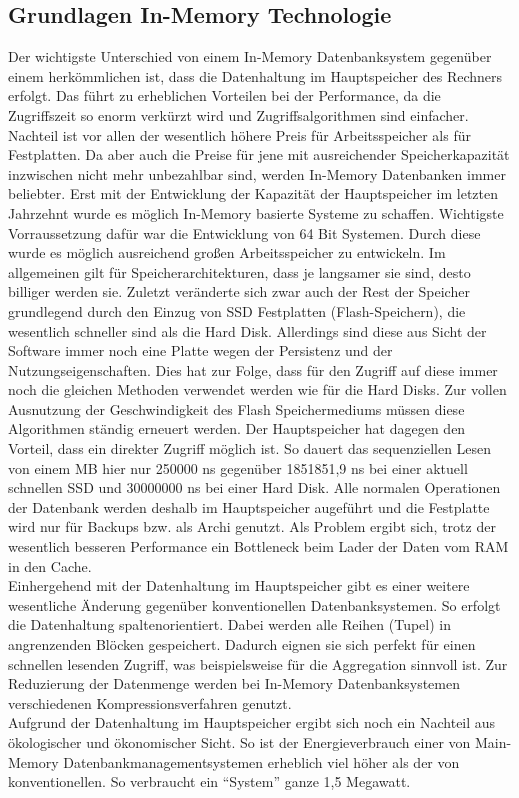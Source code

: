 \documentclass[a4paper, 12pt]{scrartcl}
\begin{document}
\subsection{Grundlagen In-Memory Technologie}
Der wichtigste Unterschied von einem In-Memory Datenbanksystem gegenüber einem herkömmlichen ist, dass die Datenhaltung im Hauptspeicher des Rechners erfolgt. Das führt zu erheblichen Vorteilen bei der Performance, da die Zugriffszeit so enorm verkürzt wird und Zugriffsalgorithmen sind einfacher. Nachteil ist vor allen der wesentlich höhere Preis für Arbeitsspeicher als für Festplatten. Da aber auch die Preise für jene mit ausreichender Speicherkapazität inzwischen nicht mehr unbezahlbar sind, werden In-Memory Datenbanken immer beliebter. Erst mit der Entwicklung der Kapazität der Hauptspeicher im letzten Jahrzehnt wurde es möglich In-Memory basierte Systeme zu schaffen. Wichtigste Vorraussetzung dafür war die Entwicklung von 64 Bit Systemen. Durch diese wurde es möglich ausreichend großen Arbeitsspeicher zu entwickeln. Im allgemeinen gilt für Speicherarchitekturen, dass je langsamer sie sind, desto billiger werden sie. Zuletzt veränderte sich zwar auch der Rest der Speicher grundlegend durch den Einzug von SSD Festplatten (Flash-Speichern), die wesentlich schneller sind als die Hard Disk. Allerdings sind diese aus Sicht der Software immer noch eine Platte wegen der Persistenz und der Nutzungseigenschaften. Dies hat zur Folge, dass für den Zugriff auf diese immer noch die gleichen Methoden verwendet werden wie für die Hard Disks. Zur vollen Ausnutzung der Geschwindigkeit des Flash Speichermediums müssen diese Algorithmen ständig erneuert werden. Der Hauptspeicher hat dagegen den Vorteil, dass ein direkter Zugriff möglich ist. So dauert das sequenziellen Lesen von einem MB hier nur 250000 ns gegenüber 1851851,9 ns bei einer aktuell schnellen SSD und 30000000 ns bei einer Hard Disk. Alle normalen Operationen der Datenbank werden deshalb im Hauptspeicher augeführt und die Festplatte wird nur für Backups bzw. als Archi genutzt. Als Problem ergibt sich, trotz der wesentlich besseren Performance ein Bottleneck beim Lader der Daten vom RAM in den Cache. \\Einhergehend mit der Datenhaltung im Hauptspeicher gibt es einer weitere wesentliche Änderung gegenüber konventionellen Datenbanksystemen. So erfolgt die Datenhaltung spaltenorientiert. Dabei werden alle Reihen (Tupel) in angrenzenden Blöcken gespeichert. Dadurch eignen sie sich perfekt für einen schnellen lesenden Zugriff, was beispielsweise für die Aggregation sinnvoll ist. Zur Reduzierung der Datenmenge werden bei In-Memory Datenbanksystemen verschiedenen Kompressionsverfahren genutzt. \\ Aufgrund der Datenhaltung im Hauptspeicher ergibt sich noch ein Nachteil aus ökologischer und ökonomischer Sicht. So ist der Energieverbrauch einer von Main-Memory Datenbankmanagementsystemen erheblich viel höher als der von konventionellen. So verbraucht ein "`System"' ganze 1,5 Megawatt. 
\newpage
\end{document}
